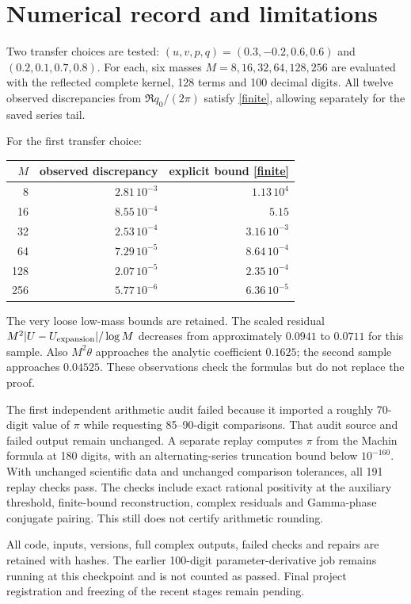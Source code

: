 \documentclass[11pt,a4paper]{article}
\begin{document}
\newpage
\section{Numerical record and limitations}
Two transfer choices are tested:
$(u,v,p,q)=(0.3,-0.2,0.6,0.6)$ and $(0.2,0.1,0.7,0.8)$.
For each, six masses $M=8,16,32,64,128,256$ are evaluated with the
reflected complete kernel, 128 terms and 100 decimal digits.
All twelve observed discrepancies from $\Re q_0/(2\pi)$ satisfy
\eqref{finite}, allowing separately for the saved series tail.

For the first transfer choice:
\begin{center}
\begin{tabular}{rrr}
\toprule
$M$ & observed discrepancy & explicit bound \eqref{finite}\\
\midrule
8&$2.81\,10^{-3}$&$1.13\,10^{4}$\\
16&$8.55\,10^{-4}$&$5.15$\\
32&$2.53\,10^{-4}$&$3.16\,10^{-3}$\\
64&$7.29\,10^{-5}$&$8.64\,10^{-4}$\\
128&$2.07\,10^{-5}$&$2.35\,10^{-4}$\\
256&$5.77\,10^{-6}$&$6.36\,10^{-5}$\\
\bottomrule
\end{tabular}
\end{center}
The very loose low-mass bounds are retained. The scaled residual
$M^2|U-U_{\rm expansion}|/\log M$ decreases from approximately
$0.0941$ to $0.0711$ for this sample.
Also $M^2\theta$ approaches the analytic coefficient $0.1625$;
the second sample approaches $0.04525$.
These observations check the formulas but do not replace the proof.

The first independent arithmetic audit failed because it imported a
roughly 70-digit value of $\pi$ while requesting 85--90-digit comparisons.
That audit source and failed output remain unchanged.
A separate replay computes $\pi$ from the Machin formula at 180 digits,
with an alternating-series truncation bound below $10^{-160}$.
With unchanged scientific data and unchanged comparison tolerances,
all 191 replay checks pass.
The checks include exact rational positivity at the auxiliary threshold,
finite-bound reconstruction, complex residuals and Gamma-phase
conjugate pairing. This still does not certify arithmetic rounding.

All code, inputs, versions, full complex outputs, failed checks and
repairs are retained with hashes. The earlier 100-digit parameter-derivative
job remains running at this checkpoint and is not counted as passed.
Final project registration and freezing of the recent stages remain pending.
\end{document}
